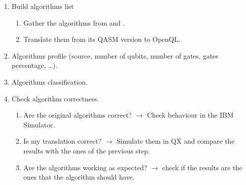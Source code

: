 \begin{enumerate}
\item Build algorithms list       
\begin{enumerate}
\item Gather the algorithms from \cite{zulehner17:effic_method_mappin_quant_circuit} and \cite{Lin_2014}.
\item Translate them from its QASM version to OpenQL.
\end{enumerate}
\item Algorithms profile (source, number of qubits, number of gates, gates percentage, \ldots{}).
\item Algorithms classification.
\item Check algorithm correctness.
\begin{enumerate}
\item Are the original algorithms correct? \(\to\) Check behaviour in the IBM Simulator.
\item Is my translation correct? \(\to\) Simulate them in QX and compare the results with the ones of the previous step.
\item Are the algorithms working as expected? \(\to\) check if the results are the ones that the algorithm should have.
\end{enumerate}
\end{enumerate}

